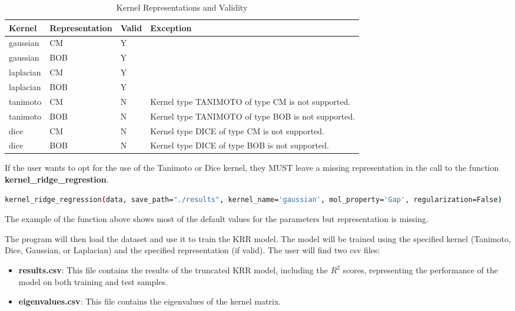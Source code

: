\documentclass{article}
\begin{document}
\begin{table}[h]
    \centering
    \begin{tabular}{|l|l|>{\raggedright\arraybackslash}p{1.5cm}|>{\raggedright\arraybackslash}p{4cm}|}
    \hline
    \textbf{Kernel} & \textbf{Representation} & \textbf{Valid} & \textbf{Exception} \\ \hline
    gaussian & CM & Y &  \\ \hline
    gaussian & BOB & Y &  \\ \hline
    laplacian & CM & Y &  \\ \hline
    laplacian & BOB & Y &  \\ \hline
    tanimoto & CM & N & Kernel type TANIMOTO of type CM is not supported. \\ \hline
    tanimoto & BOB & N & Kernel type TANIMOTO of type BOB is not supported. \\ \hline
    dice & CM & N & Kernel type DICE of type CM is not supported. \\ \hline
    dice & BOB & N & Kernel type DICE of type BOB is not supported. \\ \hline
    \end{tabular}
    \caption{Kernel Representations and Validity}
    \label{tab:kernel_validity}
    \end{table}

If the user wants to opt for the use of the Tanimoto or Dice kernel, 
they MUST leave a missing representation in the call to the function \textbf{kernel\_ridge\_regrestion}.

\begin{lstlisting}[language=bash]
    kernel_ridge_regression(data, save_path="./results", kernel_name='gaussian', mol_property='Gap', regularization=False)
\end{lstlisting}

The example of the function above shows most of the default values for the parameters but representation is missing.


The program will then load the dataset and use it to train the KRR model. The model will be trained using the specified kernel (Tanimoto, Dice, Gaussian, or Laplacian)
 and the specified representation (if valid). The user will find two csv files:  
\begin{itemize}
    \item \textbf{results.csv}: This file contains the results of the truncated KRR model, including the $R^2$ scores, representing the performance of the model on both training and test samples.
    \item \textbf{eigenvalues.csv}: This file contains the eigenvalues of the kernel matrix.
\end{itemize}
\end{document}
